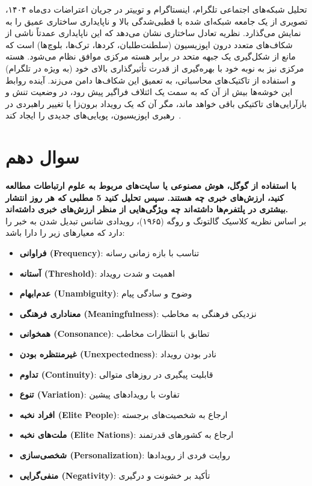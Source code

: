 \documentclass{article}
\begin{document}
	تحلیل شبکه‌های اجتماعی تلگرام، اینستاگرام و توییتر در جریان اعتراضات دی‌ماه ۱۴۰۴، تصویری از یک جامعه شبکه‌ای شده با قطبی‌شدگی بالا و ناپایداری ساختاری عمیق را به نمایش می‌گذارد. نظریه تعادل ساختاری نشان می‌دهد که این ناپایداری عمدتاً ناشی از شکاف‌های متعدد درون اپوزیسیون (سلطنت‌طلبان، کردها، ترک‌ها، بلوچ‌ها) است که مانع از شکل‌گیری یک جبهه متحد در برابر هسته مرکزی موافق نظام می‌شود. هسته مرکزی نیز به نوبه خود با بهره‌گیری از قدرت تأثیرگذاری بالای خود (به ویژه در تلگرام) و استفاده از تاکتیک‌های محاسباتی، به تعمیق این شکاف‌ها دامن می‌زند. آینده روابط این خوشه‌ها بیش‌ از آن که به سمت یک ائتلاف فراگیر پیش رود، در وضعیت تنش و بازآرایی‌های تاکتیکی باقی خواهد ماند، مگر آن که یک رویداد برون‌زا یا تغییر راهبردی در رهبری اپوزیسیون، پویایی‌های جدیدی را ایجاد کند~\cite{brin1998pagerank}.


\section{سوال دهم}
\textbf{با استفاده از گوگل، هوش مصنوعی یا سایت‌های مربوط به علوم ارتباطات مطالعه کنید، ارزش‌های خبری چه هستند. سپس تحلیل کنید 5 مطلبی که هر روز انتشار بیشتری در پلتفرم‌ها داشته‌اند چه ویژگی‌هایی از منظر ارزش‌های خبری داشته‌اند.}
\\
	بر اساس نظریه کلاسیک گالتونگ و روگه (۱۹۶۵)، رویدادی شانس تبدیل شدن به خبر را دارد که معیارهای زیر را دارا باشد:
	
	\begin{itemize}
		\item \textbf{فراوانی (Frequency)}: تناسب با بازه زمانی رسانه
		\item \textbf{آستانه (Threshold)}: اهمیت و شدت رویداد
		\item \textbf{عدم‌ابهام (Unambiguity)}: وضوح و سادگی پیام
		\item \textbf{معناداری فرهنگی (Meaningfulness)}: نزدیکی فرهنگی به مخاطب
		\item \textbf{همخوانی (Consonance)}: تطابق با انتظارات مخاطب
		\item \textbf{غیرمنتظره بودن (Unexpectedness)}: نادر بودن رویداد
		\item \textbf{تداوم (Continuity)}: قابلیت پیگیری در روزهای متوالی
		\item \textbf{تنوع (Variation)}: تفاوت با رویدادهای پیشین
		\item \textbf{افراد نخبه (Elite People)}: ارجاع به شخصیت‌های برجسته
		\item \textbf{ملت‌های نخبه (Elite Nations)}: ارجاع به کشورهای قدرتمند
		\item \textbf{شخصی‌سازی (Personalization)}: روایت فردی از رویدادها
		\item \textbf{منفی‌گرایی (Negativity)}: تأکید بر خشونت و درگیری
	\end{itemize}
	
\end{document}

